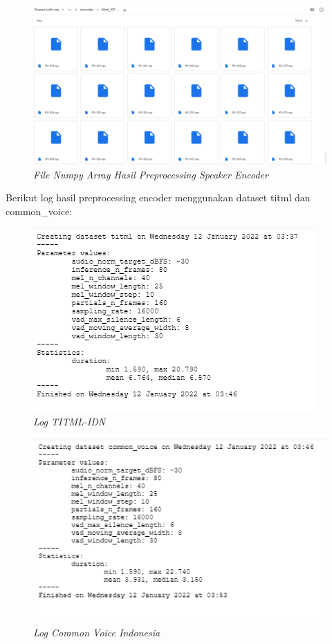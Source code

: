 \begin{enumerate}
\begin{figure}[H]
    \centering
    \includegraphics[scale=0.35]{figures/hasil5}
    \caption{\textit{File Numpy Array Hasil Preprocessing Speaker Encoder}}
    \label{hasil5}
\end{figure}

Berikut log hasil preprocessing encoder menggunakan dataset titml dan common\_voice:
\begin{figure}[H]
    \centering
    \includegraphics[scale=0.75]{figures/hasil6}
    \caption{\textit{Log TITML-IDN}}
    \label{hasil6}
\end{figure}

\begin{figure}[H]
    \centering
    \includegraphics[scale=0.75]{figures/hasil7}
    \caption{\textit{Log Common Voice Indonesia}}
    \label{hasil7}
\end{figure}


\end{enumerate}
